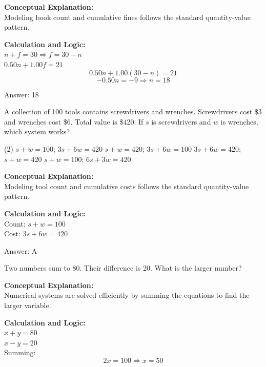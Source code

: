 \documentclass[11pt,paper=a4,answers]{exam}
\begin{document}
\begin{questions}
\begin{solution}
\textbf{Conceptual Explanation:} \\
Modeling book count and cumulative fines follows the standard quantity-value pattern.

\vspace{10pt}
\textbf{Calculation and Logic:} \\
$n + f = 30 \Rightarrow f = 30 - n$ \\
$0.50n + 1.00f = 21$ \\
\[0.50n + 1.00(30 - n) = 21\]
\[-0.50n = -9 \Rightarrow n = 18\]

\vspace{15pt}
Answer: \colorbox{yellow!100}{18}
\end{solution}

\question
A collection of 100 tools contains screwdrivers and wrenches. Screwdrivers cost \$3 and wrenches cost \$6. Total value is \$420. If $s$ is screwdrivers and $w$ is wrenches, which system works?
\begin{tasks}(2)
    \task $s + w = 100$; $3s + 6w = 420$
    \task $s + w = 420$; $3s + 6w = 100$
    \task $3s + 6w = 420$; $s + w = 420$
    \task $s + w = 100$; $6s + 3w = 420$
\end{tasks}

\begin{solution}
\textbf{Conceptual Explanation:} \\
Modeling tool count and cumulative costs follows the standard quantity-value pattern.

\vspace{10pt}
\textbf{Calculation and Logic:} \\
Count: $s + w = 100$ \\
Cost: $3s + 6w = 420$

\vspace{15pt}
Answer: \colorbox{yellow!100}{A}
\end{solution}

\question
Two numbers sum to 80. Their difference is 20. What is the larger number?

\begin{solution}
\textbf{Conceptual Explanation:} \\
Numerical systems are solved efficiently by summing the equations to find the larger variable.

\vspace{10pt}
\textbf{Calculation and Logic:} \\
$x + y = 80$ \\
$x - y = 20$ \\
Summing:
\[2x = 100 \Rightarrow x = 50\]


\end{solution}
\end{questions}
\end{document}
